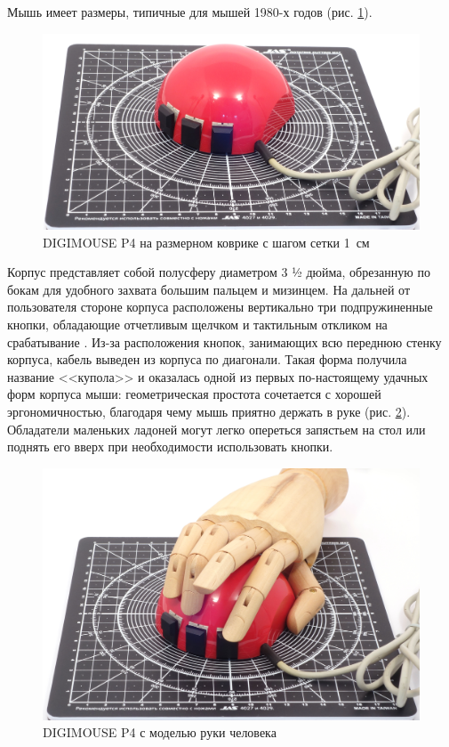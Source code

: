 \documentclass[11pt, a4paper]{article}
\begin{document}
Мышь имеет размеры, типичные для мышей 1980-х годов (рис. \ref{fig:DIGIMOUSEP4Size}).

\begin{figure}[h]
    \centering
    \includegraphics[scale=0.5]{1982_depraz_digimouse/size_30.jpg}
    \caption{DIGIMOUSE P4 на размерном коврике с шагом сетки 1~см}
    \label{fig:DIGIMOUSEP4Size}
\end{figure}

Корпус представляет собой полусферу диаметром 3 ½ дюйма, обрезанную по бокам для удобного захвата большим пальцем и мизинцем. На дальней от пользователя стороне корпуса расположены вертикально три подпружиненные кнопки, обладающие отчетливым щелчком и тактильным откликом на срабатывание \cite{oldmouse}. Из-за расположения кнопок, занимающих всю переднюю стенку корпуса, кабель выведен из корпуса по диагонали. Такая форма получила название <<купола>> и оказалась одной из первых по-настоящему удачных форм корпуса мыши: геометрическая простота сочетается с хорошей эргономичностью, благодаря чему мышь приятно держать в руке (рис. \ref{fig:DIGIMOUSEP4Hand}). Обладатели маленьких ладоней могут легко опереться запястьем на стол или поднять его вверх при необходимости использовать кнопки.

\begin{figure}[h]
    \centering
    \includegraphics[scale=0.5]{1982_depraz_digimouse/hand_30.jpg}
    \caption{DIGIMOUSE P4 с моделью руки человека}
    \label{fig:DIGIMOUSEP4Hand}
\end{figure}
\end{document}
